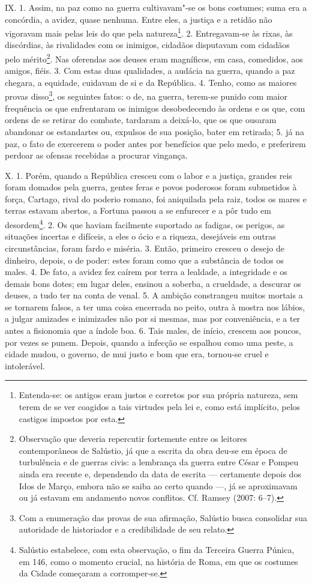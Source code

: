 IX. 1. Assim, na paz como na guerra cultivavam"-se os bons costumes; suma era a
concórdia, a avidez, quase nenhuma. Entre eles, a justiça e a retidão não
vigoravam mais pelas leis do que pela natureza\footnote{Entenda-se: os antigos
eram justos e corretos por sua própria natureza, sem terem de se ver coagidos a
tais virtudes pela lei e, como está implícito, pelos castigos impostos por
esta.}. 2. Entregavam-se às rixas, às discórdias, às rivalidades com os
inimigos, cidadãos disputavam com cidadãos pelo mérito\footnote{Observação que
deveria repercutir fortemente entre os leitores contemporâneos de Salústio, já
que a escrita da obra deu-se em época de turbulência e de guerras civis: a
lembrança da guerra entre César e Pompeu ainda era recente e, dependendo da
data de escrita --- certamente depois dos Idos de Março, embora não se saiba ao
certo quando ---, já se aproximavam ou já estavam
em andamento novos conflitos. Cf. Ramsey (2007: 6--7).}. Nas oferendas aos deuses eram magníficos, em
casa, comedidos, aos amigos, fiéis. 3. Com estas duas qualidades, a audácia na
guerra, quando a paz chegara, a equidade, cuidavam de si e da República. 4. Tenho,
como as maiores provas disso\footnote{Com a enumeração das provas de sua
afirmação, Salústio busca consolidar sua autoridade de historiador e a
credibilidade de seu relato.}, os seguintes fatos: o de, na guerra, terem-se
punido com maior frequência os que enfrentaram os inimigos desobedecendo às
ordens e os que, com ordens de se retirar do combate, tardaram a deixá-lo, que
os que ousaram abandonar os estandartes ou, expulsos de sua posição, bater em
retirada; 5. já na paz, o fato de exercerem o poder antes por benefícios que
pelo medo, e preferirem perdoar as ofensas recebidas a procurar vingança. 

X. 1. Porém, quando a República cresceu com o labor e a justiça, grandes reis
foram domados pela guerra, gentes feras e povos poderosos foram submetidos à
força, %
Cartago, rival do poderio romano, foi aniquilada pela raiz, todos os
mares e terras estavam abertos, a Fortuna passou a se enfurecer e a pôr tudo em
desordem\footnote{Salústio estabelece, com esta observação, o fim da Terceira
Guerra Púnica, em 146, como o momento crucial, na história de Roma, em que os
costumes da Cidade começaram a corromper-se.}. 2. Os que haviam facilmente
suportado as fadigas, os perigos, as situações incertas e difíceis, a eles o
ócio e a riqueza, desejáveis em outras circunstâncias, foram fardo e miséria.
3. Então, primeiro cresceu o desejo de dinheiro, depois, o de poder: estes
foram como que a substância de todos os males. 4. De fato, a avidez fez caírem
por terra a lealdade, a integridade e os demais bons dotes; em lugar deles,
ensinou a soberba, a crueldade, a descurar os deuses, a tudo ter na conta de
venal. 5. A ambição constrangeu muitos mortais a se tornarem falsos, a ter uma
coisa encerrada no peito, outra à mostra nos lábios, a julgar amizades e
inimizades não por si mesmas, mas por conveniência, e a ter antes a fisionomia
que a índole boa. 6. Tais males, de início, crescem aos poucos, por vezes se
punem. Depois, quando a infecção se espalhou como uma peste, a cidade mudou, o
governo, de mui justo e bom que era, tornou-se cruel e intolerável.

